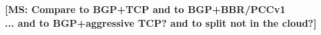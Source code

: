 \documentclass[10pt,sigconf]{acmart}
\newcommand{\mycomm}[3]{{\color{#2} \textbf{[#1: #3]}}}
\newcommand{\mycomm}[3]{}
\newcommand{\MS}[1]{\mycomm{MS}{red}{#1}}
\begin{document}

\MS{Compare to BGP+TCP and to BGP+BBR/PCCv1 \\
... and to BGP+aggressive TCP? and to split not in the cloud?}

\end{document}
